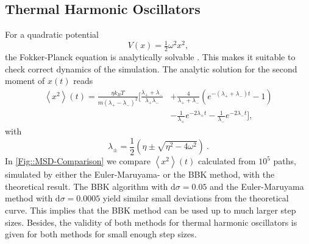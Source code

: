 	\subsection{Thermal Harmonic Oscillators}
	For a quadratic potential
	\begin{equation}
		V(x) =	\tfrac{1}{2} \omega^2 x^2,
	\end{equation}
	the Fokker-Planck equation is analytically solvable \cite{risken1996fokker}. This makes it suitable to check correct dynamics of the simulation. The analytic solution for the second moment of $x(t)$ reads
	\begin{equation} \label{Eq::MSD-HO}
		\begin{split}
					\left \langle x^2 \right \rangle (t)  =	\frac{\eta {k_B T}}{m (\lambda_+ - \lambda_-)^2} \bigg[ \frac{\lambda_+ + \lambda_-}{\lambda_+ \lambda_-} &+ \frac{4}{\lambda_+ + \lambda_-} \left(e^{- (\lambda_+ + \lambda_-) t} - 1\right) \\
					&- \frac{1}{\lambda_+} e^{-2\lambda_+ t} - \frac{1}{\lambda_-} e^{- 2 \lambda_- t}\bigg],
		\end{split}
	\end{equation}
	with
	\begin{equation}
		\lambda_{\pm} =	\frac{1}{2} \left(\eta \pm \sqrt{\eta^2 - 4 \omega^2}\right)~.
	\end{equation}
	In \autoref{Fig::MSD-Comparison} we compare $\left \langle x^2 \right \rangle (t)$ calculated from $10^5$ paths, simulated by either the Euler-Maruyama- or the BBK method, with the theoretical result. The BBK algorithm with $\text{d}\sigma =	0.05$ and the Euler-Maruyama method with $\text{d}\sigma =	0.0005$ yield similar small deviations from the theoretical curve. This implies that the BBK method can be used up to much larger step sizes. Besides, the validity of both methods for thermal harmonic oscillators is given for both methods for small enough step sizes.
	
